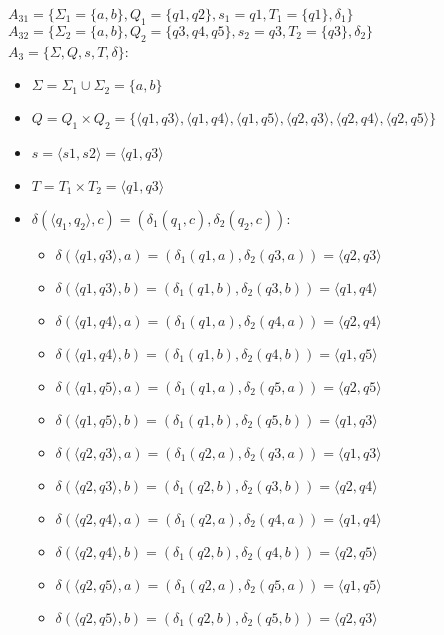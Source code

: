 \documentclass[12pt, a4paper]{article}
\begin{document}
\begin{enumerate}
\(A_{31}=\{\Sigma_1=\{a,b\}, Q_1=\{q1,q2\}, s_1=q1, T_1=\{q1\}, \delta_1\} \)
\\\(A_{32}=\{\Sigma_2=\{a,b\}, Q_2=\{q3,q4,q5\}, s_2=q3, T_2=\{q3\}, \delta_2\} \)
\\\(A_3=\{\Sigma, Q, s, T, \delta\} \):
\begin{itemize}
    \item \(\Sigma=\Sigma_1 \cup \Sigma_2=\{a,b\} \)
    \item \(Q=Q_1 \times Q_2=\{\langle q1,q3 \rangle, \langle q1,q4 \rangle, \langle q1,q5 \rangle, \langle q2,q3 \rangle, \langle q2,q4 \rangle, \langle q2,q5 \rangle \}\)
    \item \(s=\langle s1,s2 \rangle = \langle q1,q3 \rangle\)
    \item \(T=T_1 \times T_2= \langle q1,q3 \rangle\)
    \item \(\delta(\langle q_1,q_2 \rangle,c)=(\delta_1(q_1,c),\delta_2(q_2,c))\):
    \begin{itemize}
        \item \(\delta(\langle q1,q3 \rangle,a)=(\delta_1(q1,a),\delta_2(q3,a))=\langle q2,q3 \rangle\)
        \item \(\delta(\langle q1,q3 \rangle,b)=(\delta_1(q1,b),\delta_2(q3,b))=\langle q1,q4 \rangle\)
        \item \(\delta(\langle q1,q4 \rangle,a)=(\delta_1(q1,a),\delta_2(q4,a))=\langle q2,q4 \rangle\)
        \item \(\delta(\langle q1,q4 \rangle,b)=(\delta_1(q1,b),\delta_2(q4,b))=\langle q1,q5 \rangle\)
        \item \(\delta(\langle q1,q5 \rangle,a)=(\delta_1(q1,a),\delta_2(q5,a))=\langle q2,q5 \rangle\)
        \item \(\delta(\langle q1,q5 \rangle,b)=(\delta_1(q1,b),\delta_2(q5,b))=\langle q1,q3 \rangle\)
        
        \item \(\delta(\langle q2,q3 \rangle,a)=(\delta_1(q2,a),\delta_2(q3,a))=\langle q1,q3 \rangle\)
        \item \(\delta(\langle q2,q3 \rangle,b)=(\delta_1(q2,b),\delta_2(q3,b))=\langle q2,q4 \rangle\)
        \item \(\delta(\langle q2,q4 \rangle,a)=(\delta_1(q2,a),\delta_2(q4,a))=\langle q1,q4 \rangle\)
        \item \(\delta(\langle q2,q4 \rangle,b)=(\delta_1(q2,b),\delta_2(q4,b))=\langle q2,q5 \rangle\)
        \item \(\delta(\langle q2,q5 \rangle,a)=(\delta_1(q2,a),\delta_2(q5,a))=\langle q1,q5 \rangle\)
        \item \(\delta(\langle q2,q5 \rangle,b)=(\delta_1(q2,b),\delta_2(q5,b))=\langle q2,q3 \rangle\)
    \end{itemize}
\end{itemize}


\end{enumerate}
\end{document}
